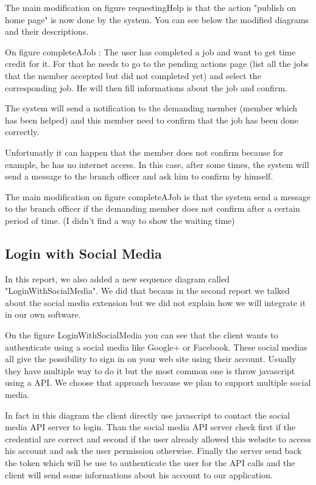 \documentclass[11pt, a4paper]{article}   	%
\begin{document}
The main modification on figure {requestingHelp} is that the action "publish on home page" is now done by the system. You can see below the modified 
diagrams and their descriptions.


On figure {completeAJob} : The user has completed a job and want to get time credit for it. For that he needs to go to the pending actions page (list all the jobs that the member accepted but did not completed yet) and select the corresponding job. He will then fill informations about the job and confirm. 

The system will send a notification to the demanding member (member which has been helped) and this member need to confirm that the job has been done correctly.

Unfortunatly it can happen that the member does not confirm because for example, he has no internet access. In this case, after some times, the system will send a message to the branch officer and ask him to confirm by himself.

The main modification on figure {completeAJob} is that the system send a message to the branch officer if the demanding member does not confirm after a certain period of time. (I didn't find a way to show the waiting time)

\subsection{Login with Social Media}

In this report, we also added a new sequence diagram called "LoginWithSocialMedia". We did that becaus in the second report we talked about the social media extension but we did not explain how we will integrate it in our own software.


On the figure {LoginWithSocialMedia} you can see that the client wants to authenticate using a social media like Google+ or Facebook. These social medias all give the possibility to sign in on your web site using their account. Usually they have multiple way to do it but the most common one is throw javascript using a API. We choose that approach because we plan to support multiple social media.

In fact in this diagram the client directly use javascript to contact the social media API server to login. Than the social media API server check first if the credential are correct and second if the user already allowed this website to access his account and ask the user permission otherwise. 
Finally the server send back the token which will be use to authenticate the user for the API calls and the client will send some informations about his account to our application.
\end{document}
